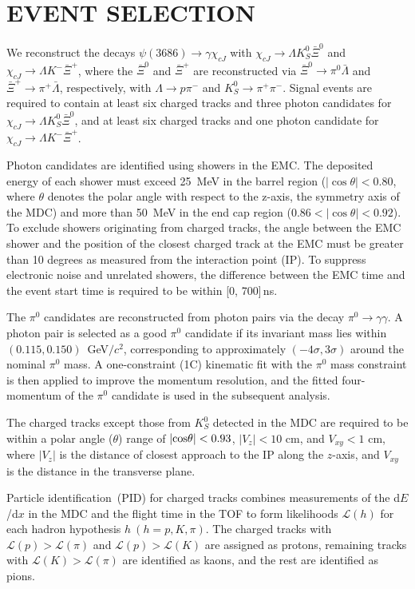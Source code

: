 \documentclass[amsmath,amssymb,twocolumn,prd,floatfix,showpacs,nofootinbib]{revtex4-1}
\begin{document}
\section{EVENT SELECTION}
\label{sec:selection}

We reconstruct the decays $\psi(3686) \to \gamma \chi_{cJ}$ with $\chi_{cJ} \to \Lambda K^0_S\bar \Xi^0$ and $\chi_{cJ} \to \Lambda K^-\bar \Xi^+$, where the $\bar \Xi^0$ and $\bar \Xi^+$ are reconstructed via $\bar \Xi^0 \to \pi^0 \bar \Lambda$ and $\bar \Xi^+ \to \pi^+ \bar \Lambda$, respectively, with $\Lambda \to p\pi^-$ and $K^0_S \to \pi^+\pi^-$.
 Signal events are required to contain at least six charged tracks and three photon candidates for $\chi_{cJ} \to \Lambda K^0_S\bar \Xi^0$,
and at least six charged tracks and one photon candidate for $\chi_{cJ} \to \Lambda K^-\bar \Xi^+$.
 
Photon candidates are identified using showers in the EMC. The deposited energy of each shower must exceed 25~MeV in the barrel region ($|\cos \theta|< 0.80$, where $\theta$ denotes the
polar angle with respect to the z-axis, the symmetry axis of the MDC) and more than 50~MeV in the end cap region ($0.86 <|\cos \theta|< 0.92$). To exclude showers originating from charged tracks, the angle between the EMC shower and the position of the closest charged track at the EMC must be greater than 10 degrees as measured from the interaction point (IP). To suppress electronic noise and unrelated showers, the difference between the EMC time and the event start time is required to be within [0, 700]\,ns.

The $\pi^{0}$ candidates are reconstructed from photon pairs via the decay $\pi^{0}\to\gamma\gamma$. A photon pair is selected as a good $\pi^{0}$ candidate if its invariant mass lies within $(0.115, 0.150)$~GeV$/c^{2}$, corresponding to approximately $(-4\sigma, 3\sigma)$ around the nominal $\pi^{0}$ mass. A one-constraint (1C) kinematic fit with the $\pi^{0}$ mass constraint is then applied to improve the momentum resolution, and the fitted four-momentum of the $\pi^{0}$ candidate is used in the subsequent analysis.

The charged tracks except those from $ K^0_S$ detected in the MDC are required to be within a polar angle ($\theta$) range of $|\rm{cos\theta}|<0.93$, $|V_{z}|<10$ cm, and $V_{xy}<1$ cm, where $|V_{z}|$ is the distance of closest approach to the IP along the $z$-axis, and $V_{xy}$ is the distance in the
transverse plane.

Particle identification~(PID) for charged tracks combines measurements of the d$E$/d$x$ in the MDC and the flight time in the TOF to form likelihoods $\mathcal{L}(h)$ for each hadron hypothesis $h~(h=p, K, \pi)$.
The charged tracks with $\mathcal{L}(p)>\mathcal{L}(\pi)$ and $\mathcal{L}(p)>\mathcal{L}(K)$ are assigned as protons, remaining tracks with $\mathcal{L}(K)>\mathcal{L}(\pi)$ are identified as kaons, and the rest are identified as pions.
\end{document}
